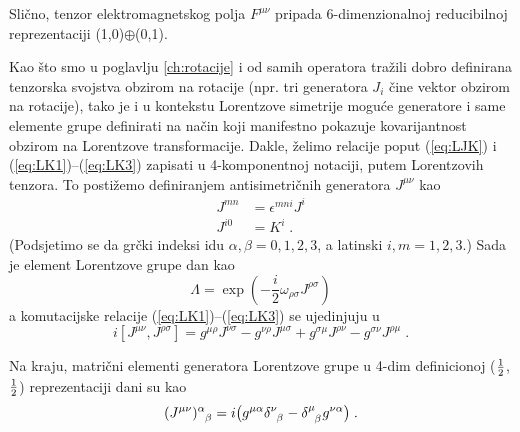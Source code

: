 Slično, tenzor elektromagnetskog polja $F^{\mu\nu}$ pripada
6-dimenzionalnoj reducibilnoj reprezentaciji (1,0)$\oplus$(0,1).


Kao što smo u poglavlju \ref{ch:rotacije} i od samih operatora tražili
dobro definirana tenzorska svojstva obzirom na rotacije
(npr. tri generatora $J_i$ čine vektor obzirom na rotacije), tako
je i u kontekstu Lorentzove simetrije moguće generatore i
same elemente grupe definirati na način koji manifestno pokazuje
kovarijantnost obzirom na Lorentzove transformacije.
Dakle, želimo relacije poput (\ref{eq:LJK}) i (\ref{eq:LK1})--(\ref{eq:LK3}) 
zapisati u 4-komponentnoj notaciji, putem Lorentzovih tenzora.
To postižemo definiranjem antisimetričnih generatora $J^{\mu\nu}$ kao
\begin{align}
J^{mn}& = \epsilon^{mni} J^i \\
J^{i0}& = K^i \;.
\label{eq:defJmn}
\end{align}
(Podsjetimo se da grčki indeksi idu $\alpha,\beta = 0,1,2,3$, a 
latinski $i,m = 1,2,3$.)  
Sada je element Lorentzove grupe dan kao
\begin{equation}
 \Lambda = \exp\left(-\frac{i}{2} \omega_{\rho\sigma} J^{\rho\sigma}\right)
\label{eq:4DLorentz}
\end{equation}
a komutacijske relacije (\ref{eq:LK1})--(\ref{eq:LK3}) se ujedinjuju u
\begin{equation}
i [ J^{\mu\nu}, J^{\rho\sigma}] = g^{\mu\rho} J^{\nu\sigma}
- g^{\nu\rho} J^{\mu\sigma} + g^{\sigma\mu} J^{\rho\nu}
- g^{\sigma\nu} J^{\rho\mu} \;.
\label{eq:4DLorKom}
\end{equation}

Na kraju, matrični elementi generatora Lorentzove grupe u
4-dim definicionoj ($\frac{1}{2}$, $\frac{1}{2}$) reprezentaciji dani su kao
\begin{equation}
\tensor{(J^{\mu\nu})}{^\alpha_\beta} = i \big(
g^{\mu\alpha}\tensor{\delta}{^\nu_\beta} - \tensor{\delta}{^\mu_\beta}
g^{\nu\alpha} \big) \;.
\label{eq:4DJmn}
\end{equation}

